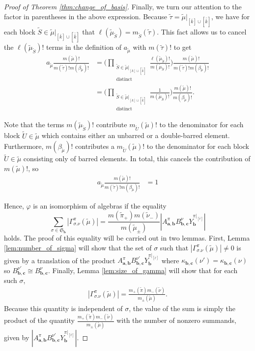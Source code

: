 \documentclass[ALCO,Unicode,published]{cedram}
\newcommand{\SG}{\mathfrak{S}}
\newcommand{\bfa}{{\boldsymbol{a}}}
\newcommand{\bfb}{{\boldsymbol{b}}}
\newcommand{\bfc}{{\boldsymbol{c}}}
\newcommand{\ttau}{{\tilde{\tau}}}
\newcommand{\tpi}{{\tilde{\pi}}}
\newcommand{\tmu}{{\tilde{\mu}}}
\newcommand{\tnu}{{\tilde{\nu}}}
\newcommand{\tS}{{\tilde{S}}}
\newcommand{\tU}{{\tilde{U}}}
\newcommand{\ov}[1]{\bar{#1}}
\newcommand{\ovb}[1]{\left[\ov{#1}\right]}
\newcommand{\ovov}[1]{\bar{\bar{#1}}}
\newcommand{\ovovb}[1]{\left[\ovov{#1}\right]}
\newcommand{\abs}[1]{\left| #1\right |}
\begin{document}
\begin{proof}[Proof of Theorem \ref{thm:change_of_basis}]
    Finally, we turn our attention to the factor in parentheses in the above expression. Because $\ttau=\tmu|_{\ovb{k}\cup\ovovb{k}}$, we have for each block $\tS\in\tmu|_{\ovb{k}\cup\ovovb{k}}$ that $\ell(\tmu_{\tS})=m_{\tS}(\ttau)$. This fact allows us to cancel the $\ell(\tmu_\tS)!$ terms in the definition of $a_\tmu$ with $m(\ttau)!$ to get
    \begin{align*}
        a_\tmu\frac{m(\tmu)!}{m(\ttau)!m(\beta_\tmu)!}&=\Bigg(\prod_{\substack{\tS\in\tmu|_{[k]\cup\ovovb{k}}\\\text{distinct}}}\frac{\ell(\tmu_\tS)!}{m(\tmu_\tS)!}\Bigg)\frac{m(\tmu)!}{m(\ttau)!m(\beta_\tmu)!}\\
        &=\Bigg(\prod_{\substack{\tS\in\tmu|_{[k]\cup\ovovb{k}}\\\text{distinct}}}\frac{1}{m(\tmu_\tS)!}\Bigg)\frac{m(\tmu)!}{m(\beta_\tmu)!}.
    \end{align*} 

    Note that the terms $m(\tmu_\tS)!$ contribute $m_\tU(\tmu)!$ to the denominator for each block $\tU\in\tmu$ which contains either an unbarred or a double-barred element. Furthermore, $m(\beta_\tmu)!$ contributes a $m_\tU(\tmu)!$ to the denominator for each block $\tU\in\tmu$ consisting only of barred elements. In total, this cancels the contribution of $m(\tmu)!$, so \begin{align*}
        a_\tmu\frac{m(\tmu)!}{m(\ttau)!m(\beta_\tmu)!}&=1
    \end{align*}

    Hence, $\varphi$ is an isomorphism of algebras if the equality \[\sum_{\sigma\in\SG_\bfb}\abs{\Gamma^\pi_{\sigma.\nu}(\tmu)}=\frac{m(\tpi_+)m(\tnu_-)}{m(\tmu_\pm)}{\abs{A_{\bfa,\bfb}^\pi B_{\bfb,\bfc}^\nu Y_{\bfb}^{\pi|_{\ovb{r}}}}}\] holds. The proof of this equality will be carried out in two lemmas. First, Lemma \ref{lem:number_of_sigma} will show that the set of $\sigma$ such that $\abs{\Gamma_{\sigma.\nu}^\pi(\tmu)}\neq0$ is given by a translation of the product $A_{\bfa,\bfb}^\pi B_{\bfb,\bfc}^{\nu'} Y_\bfb^{\pi|_{\ovb{r}}}$ where $\kappa_{\bfb,\bfc}(\nu')=\kappa_{\bfb,\bfc}(\nu)$ so $B_{\bfb,\bfc}^{\nu'}\cong B_{\bfb,\bfc}^{\nu}$. Finally, Lemma \ref{lem:size_of_gamma} will show that for each such $\sigma$, \begin{align*}
        \abs{\Gamma_{\sigma.\nu}^\pi(\tmu)}=\frac{m_+(\tpi)m_-(\tnu)}{m_\pm(\tmu)}.
    \end{align*} Because this quantity is independent of $\sigma$, the value of the sum is simply the product of the quantity $\frac{m_+(\tpi)m_-(\tnu)}{m_\pm(\tmu)}$ with the number of nonzero summands, given by $\abs{A_{\bfa,\bfb}^\pi B_{\bfb,\bfc}^{\nu'} Y_\bfb^{\pi|_{\ovb{r}}}}$.
\end{proof}
\end{document}
